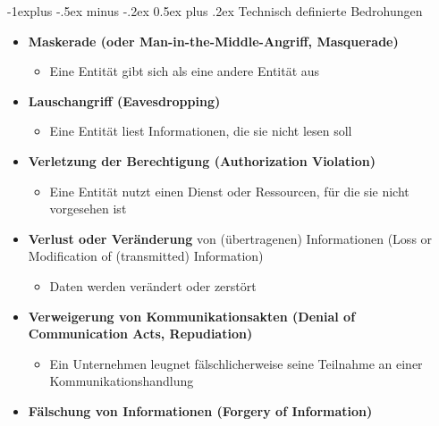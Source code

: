 \documentclass[a4paper]{article}
\makeatletter
\renewcommand{\subsection}{\@startsection{subsection}{2}{0mm}%
 {-1explus -.5ex minus -.2ex}%
 {0.5ex plus .2ex}%
 {\normalfont\normalsize\bfseries}}
\makeatother
\begin{document}
\begin{multicols}{3}
    \subsection{Technisch definierte
        Bedrohungen}

    \begin{itemize}
        \item
              \textbf{Maskerade (oder Man-in-the-Middle-Angriff, Masquerade)}

              \begin{itemize}
                  \item
                        Eine Entität gibt sich als eine andere Entität aus
              \end{itemize}
        \item
              \textbf{Lauschangriff (Eavesdropping)}

              \begin{itemize}
                  \item
                        Eine Entität liest Informationen, die sie nicht lesen soll
              \end{itemize}
        \item
              \textbf{Verletzung der Berechtigung (Authorization Violation)}

              \begin{itemize}
                  \item
                        Eine Entität nutzt einen Dienst oder Ressourcen, für die sie nicht
                        vorgesehen ist
              \end{itemize}
        \item
              \textbf{Verlust oder Veränderung} von (übertragenen) Informationen
              (Loss or Modification of (transmitted) Information)

              \begin{itemize}
                  \item
                        Daten werden verändert oder zerstört
              \end{itemize}
        \item
              \textbf{Verweigerung von Kommunikationsakten (Denial of Communication
                  Acts, Repudiation)}

              \begin{itemize}
                  \item
                        Ein Unternehmen leugnet fälschlicherweise seine Teilnahme an einer
                        Kommunikationshandlung
              \end{itemize}
        \item
              \textbf{Fälschung von Informationen (Forgery of Information)}


\end{itemize}
\end{multicols}
\end{document}
